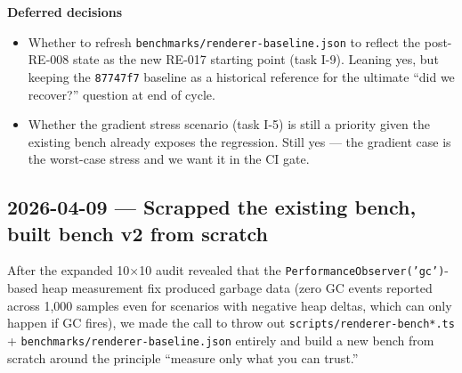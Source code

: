 \textbf{Deferred decisions}

\begin{itemize}
\tightlist
\item
  Whether to refresh \texttt{b\allowbreak{}e\allowbreak{}n\allowbreak{}c\allowbreak{}h\allowbreak{}m\allowbreak{}a\allowbreak{}r\allowbreak{}k\allowbreak{}s\allowbreak{}/\allowbreak{}r\allowbreak{}e\allowbreak{}n\allowbreak{}d\allowbreak{}e\allowbreak{}r\allowbreak{}e\allowbreak{}r\allowbreak{}-\allowbreak{}b\allowbreak{}a\allowbreak{}s\allowbreak{}e\allowbreak{}l\allowbreak{}i\allowbreak{}n\allowbreak{}e\allowbreak{}.\allowbreak{}j\allowbreak{}s\allowbreak{}o\allowbreak{}n} to reflect the post-RE-008 state as the new RE-017 starting point (task I-9). Leaning yes, but keeping the \texttt{8\allowbreak{}7\allowbreak{}7\allowbreak{}4\allowbreak{}7\allowbreak{}f\allowbreak{}7} baseline as a historical reference for the ultimate ``did we recover?'' question at end of cycle.
\item
  Whether the gradient stress scenario (task I-5) is still a priority given the existing bench already exposes the regression. Still yes --- the gradient case is the worst-case stress and we want it in the CI gate.
\end{itemize}

\subsection{2026-04-09 --- Scrapped the existing bench, built bench v2 from scratch}\label{record-422-scrapped-the-existing-bench-built-bench-v2-from-scratch}

After the expanded 10×10 audit revealed that the \texttt{P\allowbreak{}e\allowbreak{}r\allowbreak{}f\allowbreak{}o\allowbreak{}r\allowbreak{}m\allowbreak{}a\allowbreak{}n\allowbreak{}c\allowbreak{}e\allowbreak{}O\allowbreak{}b\allowbreak{}s\allowbreak{}e\allowbreak{}r\allowbreak{}v\allowbreak{}e\allowbreak{}r\allowbreak{}(\allowbreak{}'\allowbreak{}g\allowbreak{}c\allowbreak{}'\allowbreak{})}-based heap measurement fix produced garbage data (zero GC events reported across 1,000 samples even for scenarios with negative heap deltas, which can only happen if GC fires), we made the call to throw out \texttt{s\allowbreak{}c\allowbreak{}r\allowbreak{}i\allowbreak{}p\allowbreak{}t\allowbreak{}s\allowbreak{}/\allowbreak{}r\allowbreak{}e\allowbreak{}n\allowbreak{}d\allowbreak{}e\allowbreak{}r\allowbreak{}e\allowbreak{}r\allowbreak{}-\allowbreak{}b\allowbreak{}e\allowbreak{}n\allowbreak{}c\allowbreak{}h\allowbreak{}*\allowbreak{}.\allowbreak{}t\allowbreak{}s} + \texttt{b\allowbreak{}e\allowbreak{}n\allowbreak{}c\allowbreak{}h\allowbreak{}m\allowbreak{}a\allowbreak{}r\allowbreak{}k\allowbreak{}s\allowbreak{}/\allowbreak{}r\allowbreak{}e\allowbreak{}n\allowbreak{}d\allowbreak{}e\allowbreak{}r\allowbreak{}e\allowbreak{}r\allowbreak{}-\allowbreak{}b\allowbreak{}a\allowbreak{}s\allowbreak{}e\allowbreak{}l\allowbreak{}i\allowbreak{}n\allowbreak{}e\allowbreak{}.\allowbreak{}j\allowbreak{}s\allowbreak{}o\allowbreak{}n} entirely and build a new bench from scratch around the principle ``measure only what you can trust.''

